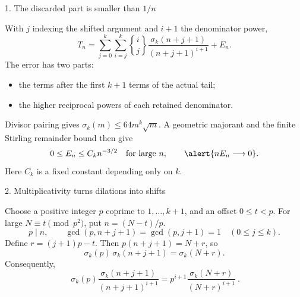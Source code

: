 \documentclass[11pt,aspectratio=169]{beamer}
\newcommand{\stir}[2]{\genfrac{\{}{\}}{0pt}{}{#1}{#2}}
\begin{document}
\begin{frame}{1. The discarded part is smaller than $1/n$}

With $j$ indexing the shifted argument and $i+1$ the denominator power,
\[
 T_n=\sum_{j=0}^{k}\sum_{i=j}^{k}\stir{i}{j}
       \frac{\sigma_k(n+j+1)}{(n+j+1)^{i+1}}+E_n.
\]
The error has two parts:
\begin{itemize}
\item the terms after the first $k+1$ terms of the actual tail;
\item the higher reciprocal powers of each retained denominator.
\end{itemize}
Divisor pairing gives $\sigma_k(m)\le64m^k\sqrt m$.
A geometric majorant and the finite Stirling remainder bound then give
\[
 0\le E_n\le C_k n^{-3/2}\quad\text{for large }n,
 \qquad\alert{nE_n\longrightarrow0}.
\]
Here $C_k$ is a fixed constant depending only on $k$.

\end{frame}


\begin{frame}{2. Multiplicativity turns dilations into shifts}

Choose a positive integer $p$ coprime to $1,\ldots,k+1$, and an offset $0\le t<p$.
For large $N\equiv t\pmod{p^2}$, put $n=(N-t)/p$.
\[
 p\mid n,\qquad
 \gcd(p,n+j+1)=\gcd(p,j+1)=1 \quad(0\le j\le k).
\]
Define $r=(j+1)p-t$. Then $p(n+j+1)=N+r$, so
\[
 \sigma_k(p)\,\sigma_k(n+j+1)=\sigma_k(N+r).
\]
Consequently,
\[
 \boxed{\ \sigma_k(p)\frac{\sigma_k(n+j+1)}{(n+j+1)^{i+1}}
       =p^{i+1}\frac{\sigma_k(N+r)}{(N+r)^{i+1}}\ }.
\]

\end{frame}

\end{document}
